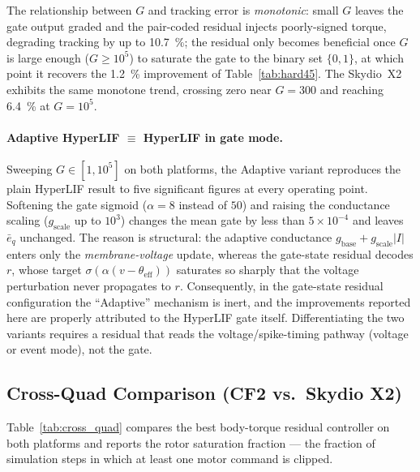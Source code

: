 \documentclass[conference]{IEEEtran}
\begin{document}
The relationship between $G$ and tracking error is \emph{monotonic}: small $G$
leaves the gate output graded and the pair-coded residual injects poorly-signed
torque, degrading tracking by up to \SI{10.7}{\percent}; the residual only
becomes beneficial once $G$ is large enough ($G \geq 10^{5}$) to saturate the
gate to the binary set $\{0, 1\}$, at which point it recovers the
\SI{1.2}{\percent} improvement of Table~\ref{tab:hard45}. The Skydio~X2 exhibits
the same monotone trend, crossing zero near $G = 300$ and reaching
\SI{+6.4}{\percent} at $G = 10^{5}$.

\paragraph{Adaptive HyperLIF $\equiv$ HyperLIF in gate mode.}
Sweeping $G \in [1, 10^{5}]$ on both platforms, the Adaptive variant reproduces
the plain HyperLIF result to five significant figures at every operating point.
Softening the gate sigmoid ($\alpha = 8$ instead of $50$) and raising the
conductance scaling ($g_{\mathrm{scale}}$ up to $10^{3}$) changes the mean gate
by less than $5\times10^{-4}$ and leaves $\bar{e}_q$ unchanged. The reason is
structural: the adaptive conductance $g_{\mathrm{base}} + g_{\mathrm{scale}}|I|$
enters only the \emph{membrane-voltage} update, whereas the gate-state residual
decodes $r$, whose target $\sigma(\alpha(v-\theta_{\mathrm{eff}}))$ saturates so
sharply that the voltage perturbation never propagates to $r$. Consequently, in
the gate-state residual configuration the ``Adaptive'' mechanism is inert, and
the improvements reported here are properly attributed to the HyperLIF gate
itself. Differentiating the two variants requires a residual that reads the
voltage/spike-timing pathway (voltage or event mode), not the gate.

\subsection{Cross-Quad Comparison (CF2 vs.\ Skydio X2)}

Table~\ref{tab:cross_quad} compares the best body-torque residual controller
on both platforms and reports the rotor saturation fraction — the fraction of
simulation steps in which at least one motor command is clipped.
\end{document}
